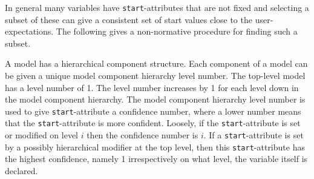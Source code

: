 In general many variables have \lstinline!start!-attributes that are not fixed and selecting a subset of these can give a consistent set of start values close to the user-expectations.
The following gives a non-normative procedure for finding such a subset.

\begin{nonnormative}
A model has a hierarchical component structure.
Each component of a model can be given a unique model component hierarchy level number.
The top-level model has a level number of 1.
The level number increases by 1 for each level down in the model component hierarchy.
The model component hierarchy level number is used to give \lstinline!start!-attribute a confidence number, where a lower number means that the \lstinline!start!-attribute is more confident.
Loosely, if the \lstinline!start!-attribute is set or modified on level $i$ then the confidence number is $i$.
If a \lstinline!start!-attribute is set by a possibly hierarchical modifier at the top level, then this \lstinline!start!-attribute has the highest confidence, namely 1 irrespectively on what level, the variable itself is declared.
\end{nonnormative}
